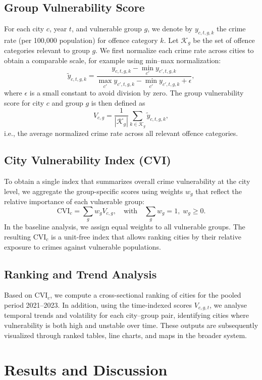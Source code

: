 \documentclass[conference]{IEEEtran}
\begin{document}
\subsection{Group Vulnerability Score}
For each city $c$, year $t$, and vulnerable group $g$, we denote by $y_{c,t,g,k}$ the crime rate (per 100{,}000 population) for offence category $k$. Let $\mathcal{K}_g$ be the set of offence categories relevant to group $g$. We first normalize each crime rate across cities to obtain a comparable scale, for example using min--max normalization:
\[
\tilde{y}_{c,t,g,k}
= \frac{y_{c,t,g,k} - \min_{c'} y_{c',t,g,k}}{\max_{c'} y_{c',t,g,k} - \min_{c'} y_{c',t,g,k} + \epsilon},
\]
where $\epsilon$ is a small constant to avoid division by zero. The group vulnerability score for city $c$ and group $g$ is then defined as
\[
V_{c,g} = \frac{1}{|\mathcal{K}_g|} \sum_{k \in \mathcal{K}_g} \tilde{y}_{c,t,g,k},
\]
i.e., the average normalized crime rate across all relevant offence categories.

\subsection{City Vulnerability Index (CVI)}
To obtain a single index that summarizes overall crime vulnerability at the city level, we aggregate the group-specific scores using weights $w_g$ that reflect the relative importance of each vulnerable group:
\[\text{CVI}_c = \sum_{g} w_g V_{c,g}, \quad \text{with} \quad \sum_{g} w_g = 1, \; w_g \ge 0.\]
In the baseline analysis, we assign equal weights to all vulnerable groups. The resulting $\text{CVI}_c$ is a unit-free index that allows ranking cities by their relative exposure to crimes against vulnerable populations.

\subsection{Ranking and Trend Analysis}
Based on $\text{CVI}_c$, we compute a cross-sectional ranking of cities for the pooled period 2021--2023. In addition, using the time-indexed scores $V_{c,g,t}$, we analyse temporal trends and volatility for each city--group pair, identifying cities where vulnerability is both high and unstable over time. These outputs are subsequently visualized through ranked tables, line charts, and maps in the broader system.

\section{Results and Discussion}
\end{document}
